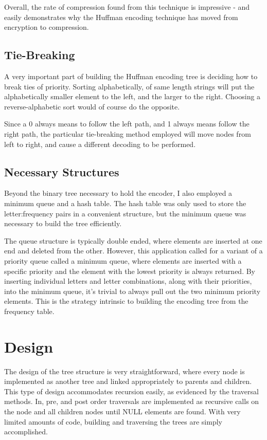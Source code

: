 \documentclass[a4paper,12pt]{article}
\begin{document}
Overall, the rate of compression found from this technique is impressive - and easily demonstrates why the Huffman encoding technique has moved from encryption to compression.

\subsection{Tie-Breaking}
A very important part of building the Huffman encoding tree is deciding how to break ties of priority.  Sorting alphabetically, of same length strings will put the alphabetically smaller element to the left, and the larger to the right.  Choosing a reverse-alphabetic sort would of course do the opposite.

Since a 0 always means to follow the left path, and 1 always means follow the right path, the particular tie-breaking method employed will move nodes from left to right, and cause a different decoding to be performed.

\subsection{Necessary Structures}
Beyond the binary tree necessary to hold the encoder, I also employed a minimum queue and a hash table.  The hash table was only used to store the letter:frequency pairs in a convenient structure, but the minimum queue was necessary to build the tree efficiently.  

The queue structure is typically double ended, where elements are inserted at one end and deleted from the other. However, this application called for a variant of a priority queue called a minimum queue, where elements are inserted with a specific priority and the element with the lowest priority is always returned.  By inserting individual letters and letter combinations, along with their priorities, into the minimum queue, it's trivial to always pull out the two minimum priority elements.  This is the strategy intrinsic to building the encoding tree from the frequency table.


\section{Design}
The design of the tree structure is very straightforward, where every node is implemented as another tree and linked appropriately to parents and children.  This type of design accommodates recursion easily, as evidenced by the traversal methods.  In, pre, and post order traversals are implemented as recursive calls on the node and all children nodes until NULL elements are found.  With very limited amounts of code, building and traversing the trees are simply accomplished.
\end{document}
